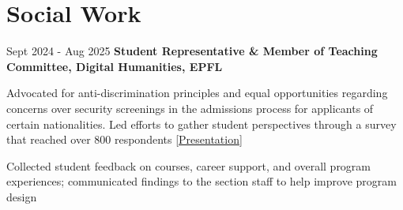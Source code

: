 \section{Social Work}

        \begin{twocolentry}[3.5 cm]{
            Sept 2024 - Aug 2025
        }
            \textbf{Student Representative \& Member of Teaching Committee, Digital Humanities, EPFL}\end{twocolentry}

        \vspace{0.10 cm}
        \begin{onecolentry}
            \begin{highlights}
                \item Advocated for anti-discrimination principles and equal opportunities regarding concerns over security screenings in the admissions process for applicants of certain nationalities. Led efforts to gather student perspectives through a survey that reached over 800 respondents [\href{https://renyi.ch/reports/dh-student-rep-survey.pdf}{Presentation}]
                \item Collected student feedback on courses, career support, and overall program experiences; communicated findings to the section staff to help improve program design
            \end{highlights}
        \end{onecolentry}


